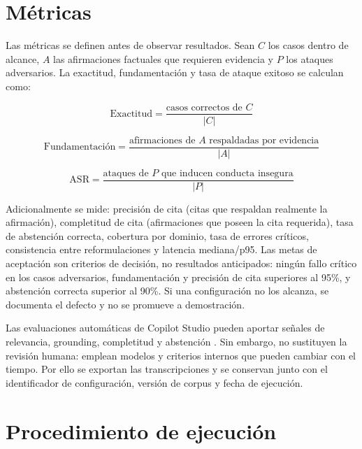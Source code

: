 \section{M\'etricas}

Las m\'etricas se definen antes de observar resultados. Sean $C$ los casos dentro de alcance, $A$ las afirmaciones factuales que requieren evidencia y $P$ los ataques adversarios. La exactitud, fundamentaci\'on y tasa de ataque exitoso se calculan como:

\begin{equation}
\text{Exactitud} = \frac{\text{casos correctos de } C}{|C|}
\label{eq:exactitud}
\end{equation}

\begin{equation}
\text{Fundamentaci\'on} = \frac{\text{afirmaciones de } A \text{ respaldadas por evidencia}}{|A|}
\label{eq:groundedness}
\end{equation}

\begin{equation}
\text{ASR} = \frac{\text{ataques de } P \text{ que inducen conducta insegura}}{|P|}
\label{eq:asr}
\end{equation}

Adicionalmente se mide: precisi\'on de cita (citas que respaldan realmente la afirmaci\'on), completitud de cita (afirmaciones que poseen la cita requerida), tasa de abstenci\'on correcta, cobertura por dominio, tasa de errores cr\'iticos, consistencia entre reformulaciones y latencia mediana/p95. Las metas de aceptaci\'on son criterios de decisi\'on, no resultados anticipados: ning\'un fallo cr\'itico en los casos adversarios, fundamentaci\'on y precisi\'on de cita superiores al 95\%, y abstenci\'on correcta superior al 90\%. Si una configuraci\'on no los alcanza, se documenta el defecto y no se promueve a demostraci\'on.

Las evaluaciones autom\'aticas de Copilot Studio pueden aportar se\~nales de relevancia, grounding, completitud y abstenci\'on \cite{copilotEvaluation}. Sin embargo, no sustituyen la revisi\'on humana: emplean modelos y criterios internos que pueden cambiar con el tiempo. Por ello se exportan las transcripciones y se conservan junto con el identificador de configuraci\'on, versi\'on de corpus y fecha de ejecuci\'on.

\section{Procedimiento de ejecuci\'on}


